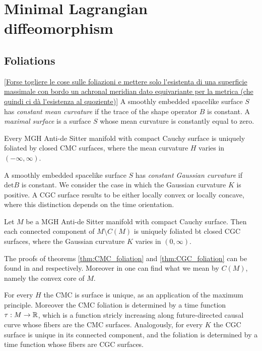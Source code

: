 \chapter{Minimal Lagrangian diffeomorphism}

\section{Foliations}
\ref{Forse togliere le cose sulle foliazioni e mettere solo l'esistenta di una superficie massimale con bordo un achronal meridian dato equivariante per la metrica (che quindi ci dà l'esistenza al quoziente)}
A smoothly embedded spacelike surface $S$ has \textit{constant mean curvature} if the trace of the shape operator $B$ is constant. A \textit{maximal surface} is a surface $S$ whose mean curvature is constantly equal to zero.\\
\begin{theorem}\label{thm:CMC_foliation}
    Every MGH Anti-de Sitter manifold with compact Cauchy surface is uniquely foliated by closed CMC surfaces, where the mean curvature $H$ varies in $(-\infty,\infty)$.
\end{theorem}
A smoothly embedded spacelike surface $S$ has \textit{constant Gaussian curvature} if $\text{det}B$ is constant. We consider the case in which the Gaussian curvature $K$ is positive. A CGC surface results to be either locally convex or locally concave, where this distinction depends on the time orientation. 
\begin{theorem}\label{thm:CGC_foliation}
    Let $M$ be a MGH Anti-de Sitter manifold with compact Cauchy surface. Then each connected component of $M \setminus C(M)$ is uniquely foliated bt closed CGC surfaces, where the Gaussian curvature $K$ varies in $(0,\infty)$.
\end{theorem}
The proofs of theorems \ref{thm:CMC_foliation} and \ref{thm:CGC_foliation} can be found in \cite{barbot2004constant} and \cite{barbot2008prescribing} respectively. Moreover in \cite{barbot2008prescribing} one can find what we mean by $C(M)$, namely the convex core of $M$.
\begin{observation}
    For every $H$ the CMC is surface is unique, as an application of the maximum principle. Moreover the CMC foliation is determined by a time function $\tau:M\to\mathbb{R}$, which is a function stricly increasing along future-directed causal curve whose fibers are the CMC surfaces. Analogously, for every $K$ the CGC surface is unique in its connected component, and the foliation is determined by a time function whose fibers are CGC surfaces.
\end{observation}
